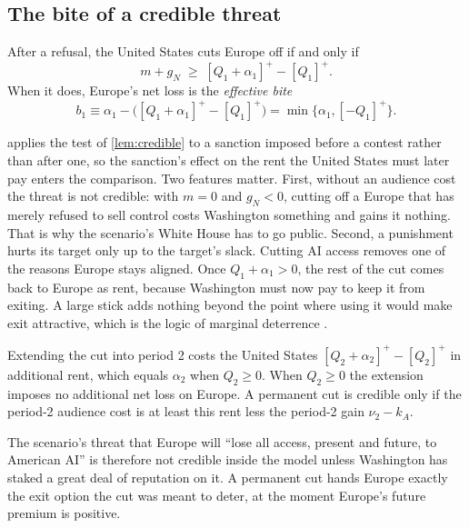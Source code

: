 \subsection{The bite of a credible threat}

\begin{lemma}\label{lem:bite}
After a refusal, the United States cuts Europe off if and only if
\begin{equation}\label{eq:credcut}
m + g_N \;\geq\; [Q_1+\alpha_1]^+ - [Q_1]^+ .
\end{equation}
When it does, Europe's net loss is the \emph{effective bite}
\begin{equation}\label{eq:bite}
b_1 \equiv \alpha_1 - \big([Q_1+\alpha_1]^+ - [Q_1]^+\big) = \min\{\alpha_1, [-Q_1]^+\}.
\end{equation}
\end{lemma}

 applies the test of \cref{lem:credible} to a sanction imposed before a contest rather than after one, so the sanction's effect on the rent the United States must later pay enters the comparison. Two features matter. First, without an audience cost the threat is not credible: with $m=0$ and $g_N<0$, cutting off a Europe that has merely refused to sell control costs Washington something and gains it nothing. That is why the scenario's White House has to go public. Second, a punishment hurts its target only up to the target's slack. Cutting AI access removes one of the reasons Europe stays aligned. Once $Q_1 + \alpha_1>0$, the rest of the cut comes back to Europe as rent, because Washington must now pay to keep it from exiting. A large stick adds nothing beyond the point where using it would make exit attractive, which is the logic of marginal deterrence \citep{stigler1970optimum}.

\begin{lemma}\label{lem:selflimit}
Extending the cut into period 2 costs the United States $[Q_2+\alpha_2]^+ - [Q_2]^+$ in additional rent, which equals $\alpha_2$ when $Q_2 \geq 0$. When $Q_2 \geq 0$ the extension imposes no additional net loss on Europe. A permanent cut is credible only if the period-2 audience cost is at least this rent less the period-2 gain $\nu_2 - k_A$.
\end{lemma}

The scenario's threat that Europe will ``lose all access, present and future, to American AI'' is therefore not credible inside the model unless Washington has staked a great deal of reputation on it. A permanent cut hands Europe exactly the exit option the cut was meant to deter, at the moment Europe's future premium is positive.

